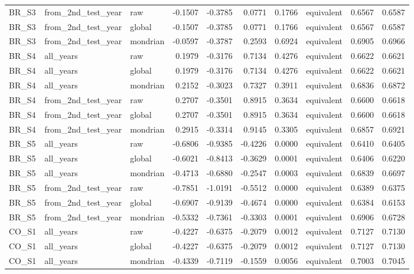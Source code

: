 \begin{tabular}{lllrrrrlrr}
BR\_S3 & from\_2nd\_test\_year & raw & -0.1507 & -0.3785 & 0.0771 & 0.1766 & equivalent & 0.6567 & 0.6587 \\
BR\_S3 & from\_2nd\_test\_year & global & -0.1507 & -0.3785 & 0.0771 & 0.1766 & equivalent & 0.6567 & 0.6587 \\
BR\_S3 & from\_2nd\_test\_year & mondrian & -0.0597 & -0.3787 & 0.2593 & 0.6924 & equivalent & 0.6905 & 0.6966 \\
BR\_S4 & all\_years & raw & 0.1979 & -0.3176 & 0.7134 & 0.4276 & equivalent & 0.6622 & 0.6621 \\
BR\_S4 & all\_years & global & 0.1979 & -0.3176 & 0.7134 & 0.4276 & equivalent & 0.6622 & 0.6621 \\
BR\_S4 & all\_years & mondrian & 0.2152 & -0.3023 & 0.7327 & 0.3911 & equivalent & 0.6836 & 0.6872 \\
BR\_S4 & from\_2nd\_test\_year & raw & 0.2707 & -0.3501 & 0.8915 & 0.3634 & equivalent & 0.6600 & 0.6618 \\
BR\_S4 & from\_2nd\_test\_year & global & 0.2707 & -0.3501 & 0.8915 & 0.3634 & equivalent & 0.6600 & 0.6618 \\
BR\_S4 & from\_2nd\_test\_year & mondrian & 0.2915 & -0.3314 & 0.9145 & 0.3305 & equivalent & 0.6857 & 0.6921 \\
BR\_S5 & all\_years & raw & -0.6806 & -0.9385 & -0.4226 & 0.0000 & equivalent & 0.6410 & 0.6405 \\
BR\_S5 & all\_years & global & -0.6021 & -0.8413 & -0.3629 & 0.0001 & equivalent & 0.6406 & 0.6220 \\
BR\_S5 & all\_years & mondrian & -0.4713 & -0.6880 & -0.2547 & 0.0003 & equivalent & 0.6839 & 0.6697 \\
BR\_S5 & from\_2nd\_test\_year & raw & -0.7851 & -1.0191 & -0.5512 & 0.0000 & equivalent & 0.6389 & 0.6375 \\
BR\_S5 & from\_2nd\_test\_year & global & -0.6907 & -0.9139 & -0.4674 & 0.0000 & equivalent & 0.6384 & 0.6153 \\
BR\_S5 & from\_2nd\_test\_year & mondrian & -0.5332 & -0.7361 & -0.3303 & 0.0001 & equivalent & 0.6906 & 0.6728 \\
CO\_S1 & all\_years & raw & -0.4227 & -0.6375 & -0.2079 & 0.0012 & equivalent & 0.7127 & 0.7130 \\
CO\_S1 & all\_years & global & -0.4227 & -0.6375 & -0.2079 & 0.0012 & equivalent & 0.7127 & 0.7130 \\
CO\_S1 & all\_years & mondrian & -0.4339 & -0.7119 & -0.1559 & 0.0056 & equivalent & 0.7003 & 0.7045 \\

\end{tabular}
